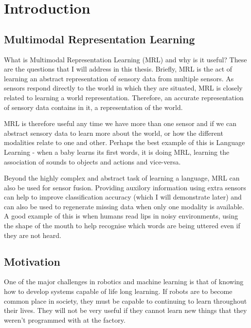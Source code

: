 
\chapter{Introduction} %

\label{Chapter1} %



\section{Multimodal Representation Learning}
What is Multimodal Representation Learning (MRL) and why is it useful? These are the questions that I will address in this thesis.
Briefly, MRL is the act of learning an abstract representation of sensory data from multiple sensors. As sensors respond directly to the world in which they are situated, MRL is closely related to learning a world representation. Therefore, an accurate representation of sensory data contains in it, a representation of the world.

MRL is therefore useful any time we have more than one sensor and if we can abstract sensory data to learn more about the world, or how the different modalities relate to one and other. Perhaps the best example of this is Language Learning - when a baby learns its first words, it is doing MRL, learning the association of sounds to objects and actions and vice-versa.

Beyond the highly complex and abstract task of learning a language, MRL can also be used for sensor fusion. Providing auxilory information using extra sensors can help to improve classification accuracy (which I will demonstrate later) and can also be used to regenerate missing data when only one modality is available.  A good example of this is when humans read lips in noisy environments, using the shape of the mouth to help recognise which words are being uttered even if they are not heard.


\section{Motivation}
One of the major challenges in robotics and machine learning is that of knowing how to develop systems capable of life long learning. If robots are to become common place in society, they must be capable to continuing to learn throughout their lives. They will not be very useful if they cannot learn new things that they weren't programmed with at the factory.

